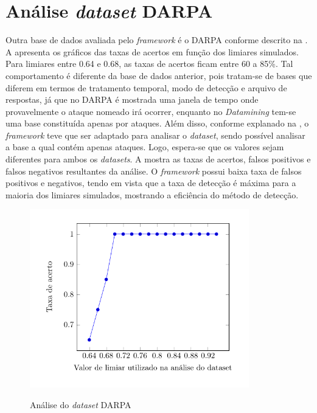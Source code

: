 \section{Análise \textit{dataset} DARPA}
Outra base de dados avaliada pelo \textit{framework} é o DARPA conforme descrito na .
A  apresenta os gráficos das taxas de acertos em função dos limiares simulados. Para limiares entre 0.64 e 0.68, as taxas de acertos ficam entre 60 a 85\%. Tal comportamento é diferente da base de dados anterior, pois tratam-se de bases que diferem em termos de tratamento temporal, modo de detecção e arquivo de respostas, já que no DARPA é mostrada uma janela de tempo onde provavelmente o ataque nomeado irá ocorrer, enquanto no \textit{Datamining} tem-se uma base constituída apenas por ataques. Além disso, conforme explanado na , o \textit{framework} teve que ser adaptado para analisar o \textit{dataset}, sendo possível analisar a base a qual contém apenas ataques. Logo, espera-se que os valores sejam diferentes para ambos os \textit{datasets}. A  mostra as taxas de acertos, falsos positivos e falsos negativos resultantes da análise. O \textit{framework} possui baixa taxa de falsos positivos e negativos, tendo em vista que a taxa de detecção é máxima para a maioria dos limiares simulados, mostrando a eficiência do método de detecção.       
 \begin{figure}[htb]
 	\centering
 	\caption{Análise do \textit{dataset} DARPA }
 	\includegraphics[width=0.85\textwidth]{figs/resultsDarpa.pdf}\\
 	\hspace{1.5cm}{Fonte: Elaborada pelo autor.}
 	\label{fig:ResultsDarpa}
 \end{figure}
 
